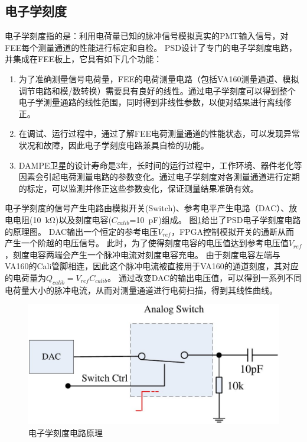 \subsection{电子学刻度}
电子学刻度指的是：利用电荷量已知的脉冲信号模拟真实的PMT输入信号，对FEE每个测量通道的性能进行标定和自检。
PSD设计了专门的电子学刻度电路，并集成在FEE板上，它具有如下几个功能：
\begin{enumerate}
	\item 为了准确测量信号电荷量，FEE的电荷测量电路（包括VA160测量通道、模拟调节电路和模/数转换）需要具有良好的线性。通过电子学刻度可以得到整个电子学测量通路的线性范围，同时得到非线性参数，以便对结果进行离线修正。
	\item 在调试、运行过程中，通过了解FEE电荷测量通道的性能状态，可以发现异常状况和故障，因此电子学刻度电路兼具自检的功能。
	\item DAMPE卫星的设计寿命是3年，长时间的运行过程中，工作环境、器件老化等因素会引起电荷测量电路的参数变化。通过电子学刻度对各测量通道进行定期的标定，可以监测并修正这些参数变化，保证测量结果准确有效。
\end{enumerate}

电子学刻度的信号产生电路由模拟开关(Switch)、参考电平产生电路（DAC）、放电电阻(\SI{10}{\kilo\ohm})以及刻度电容($C_{calib}$=\SI{10}{\pico\farad})组成。
图\ref{fig:description:fee_calibration}给出了PSD电子学刻度电路的原理图。
DAC输出一个恒定的参考电压$V_{ref}$，FPGA控制模拟开关的通断从而产生一个阶越的电压信号。
此时，为了使得刻度电容的电压值达到参考电压值$V_{ref}$，刻度电容两端会产生一个脉冲电流对刻度电容充电。
由于刻度电容左端与VA160的Cali管脚相连，因此这个脉冲电流被直接用于VA160的通道刻度，其对应的电荷量为$Q_{calib}=V_{ref}C_{calib}$。
通过改变DAC的输出电压值，可以得到一系列不同电荷量大小的脉冲电流，从而对测量通道进行电荷扫描，得到其线性曲线。

\begin{figure}[h!]
\centering
\includegraphics[width=0.7\linewidth]{chap/description/fig/fee_calibration}
\caption{电子学刻度电路原理}
\label{fig:description:fee_calibration}
\end{figure}


